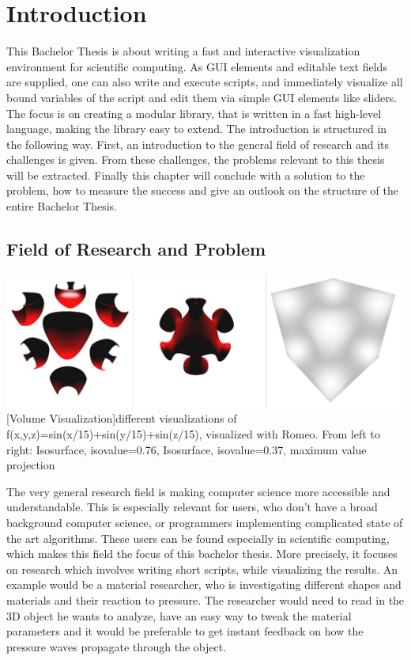 \section{Introduction}
This Bachelor Thesis is about writing a fast and interactive visualization environment for scientific computing. 
As GUI elements and editable text fields are supplied, one can also write and execute scripts, and immediately visualize all bound variables of the script and edit them via simple GUI elements like sliders. The focus is on creating a modular library, that is written in a fast high-level language, making the library easy to extend.
The introduction is structured in the following way.
First, an introduction to the general field of research and its challenges is given. 
From these challenges, the problems relevant to this thesis will be extracted.
Finally this chapter will conclude with a solution to the problem, how to measure the success and give an outlook on the structure of the entire Bachelor Thesis.
 
\subsection{Field of Research and Problem}

\vspace{1em}
\begin{minipage}{\linewidth}
    \centering
    \includegraphics[width=0.7\linewidth]{graphics/surfaces.png}
    [Volume Visualization]{different visualizations of f(x,y,z)=sin(x/15)+sin(y/15)+sin(z/15), visualized with Romeo. From left to right: Isosurface, isovalue=0.76, Isosurface, isovalue=0.37, maximum value projection}
    \label{fig:volume}
\end{minipage}



The very general research field is making computer science more accessible and understandable. 
This is especially relevant for users, who don't have a broad background computer science, or programmers implementing complicated state of the art algorithms.
These users can be found especially in scientific computing, which makes this field the focus of this bachelor thesis. 
More precisely, it focuses on research which involves writing short scripts, while visualizing the results. 
An example would be a material researcher, who is investigating different shapes and materials and their reaction to pressure.
The researcher would need to read in the 3D object he wants to analyze, have an easy way to tweak the material parameters and it would be preferable to get instant feedback on how the pressure waves propagate through the object.

